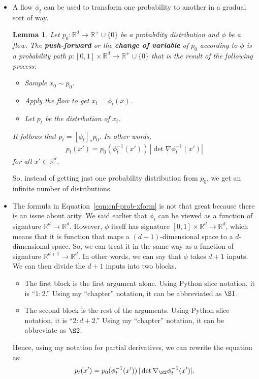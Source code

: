 \documentclass[10pt]{article}
\newtheorem{lemma}{Lemma}
\newcommand{\ra}{\rightarrow}
\newcommand{\Real}{\mathbb{R}}
\begin{document}
\begin{itemize}
  \item A flow $\phi_t$ can be used to transform one probability to another in a gradual sort of way.
  \begin{lemma}
    Let $p_0: \Real^d \ra \Real^{+} \cup \{0\}$ be a probability distribution and $\phi$ be a flow. The {\bf push-forward} or the {\bf change of variable} of $p_0$ according to $\phi$ is a probability path $p: [0,1] \times \Real^d \ra \Real^+ \cup \{0\}$ that is the result of the following process:
    \begin{itemize}
      \item Sample $x_0 \sim p_0$.
      \item Apply the flow to get $x_t = \phi_t(x)$.
      \item Let $p_t$ be the distribution of $x_t$.
    \end{itemize}
    It follows that $p_t = [\phi_t]_* p_0$. In other words,
    \begin{align}
      p_t(x') = p_0(\phi_t^{-1}(x'))\, |\det \nabla \phi_t^{-1}(x')| \label{eqn:cnf-prob-xform}
    \end{align}
    for all $x' \in \Real^d$.    
  \end{lemma}
  So, instead of getting just one probability distribution from $p_0$, we get an infinite number of distributions.  

  \item The formula in Equation~\eqref{eqn:cnf-prob-xform} is not that great because there is an issue about arity. We said earlier that $\phi_t$ can be viewed as a function of signature $\Real^d \ra \Real^d$. However, $\phi$ itself has signature $[0,1] \times \Real^{d} \ra \Real^d$, which means that it is function that maps a $(d+1)$-dimensional space to a $d$-dimensional space. So, we can treat it in the same way as a function of signature $\Real^{d+1} \ra \Real^d$. In other words, we can say that $\phi$ takes $d+1$ inputs. We can then divide the $d+1$ inputs into two blocks.
  \begin{itemize}
    \item The first block is the first argument alone. Using Python slice notation, it is ``$1:2$.'' Using my ``chapter'' notation, it can be abbreviated as $\S 1$.
    
    \item The second block is the rest of the arguments. Using Python slice notation, it is ``$2:d+2$.'' Using my ``chapter'' notation, it can be abbreviate as $\S 2$.
  \end{itemize}
  Hence, using my notation for partial derivatives, we can rewrite the equation as:
  \begin{align}
    p_t(x') = p_0(\phi_t^{-1}(x'))\, | \det \nabla_{\S 2} \phi^{-1}_t(x') |. \label{eqn:cnf-prob-xform-my-notation}
  \end{align}  


\end{itemize}
\end{document}
